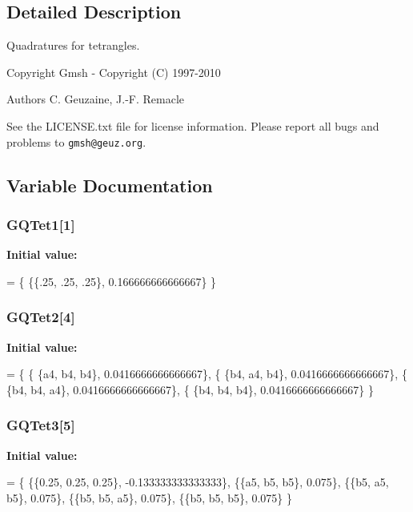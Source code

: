 \subsection{Detailed Description}
Quadratures for tetrangles. \begin{DoxyCopyright}{Copyright}
Gmsh -\/ Copyright (C) 1997-\/2010 
\end{DoxyCopyright}
\begin{DoxyAuthor}{Authors}
C. Geuzaine, J.-\/\-F. Remacle
\end{DoxyAuthor}
See the L\-I\-C\-E\-N\-S\-E.\-txt file for license information. Please report all bugs and problems to {\tt gmsh@geuz.\-org}. 

\subsection{Variable Documentation}
\subsubsection[{G\-Q\-Tet1}]{ G\-Q\-Tet1[1]}\label{GaussQuadratureTet_8cc_aa2ce0ee7b2f38327e1a88c6d06b5d1c2}
{\bfseries Initial value\-:}
\begin{DoxyCode}
= \{
  \{\{.25, .25, .25\}, 0.166666666666667\}
\}
\end{DoxyCode}
\subsubsection[{G\-Q\-Tet2}]{ G\-Q\-Tet2[4]}\label{GaussQuadratureTet_8cc_a9fd8196b6e305c2f05b00ba7eac2d2e5}
{\bfseries Initial value\-:}
\begin{DoxyCode}
= \{
  \{ \{a4, b4, b4\}, 0.0416666666666667\},
  \{ \{b4, a4, b4\}, 0.0416666666666667\},
  \{ \{b4, b4, a4\}, 0.0416666666666667\},
  \{ \{b4, b4, b4\}, 0.0416666666666667\}
\}
\end{DoxyCode}
\subsubsection[{G\-Q\-Tet3}]{ G\-Q\-Tet3[5]}\label{GaussQuadratureTet_8cc_ada56e2c1a1f3ecd12803fb374879269b}
{\bfseries Initial value\-:}
\begin{DoxyCode}
= \{
  \{\{0.25, 0.25, 0.25\}, -0.133333333333333\},
  \{\{a5, b5, b5\}, 0.075\},
  \{\{b5, a5, b5\}, 0.075\},
  \{\{b5, b5, a5\}, 0.075\},
  \{\{b5, b5, b5\}, 0.075\}
\}
\end{DoxyCode}

